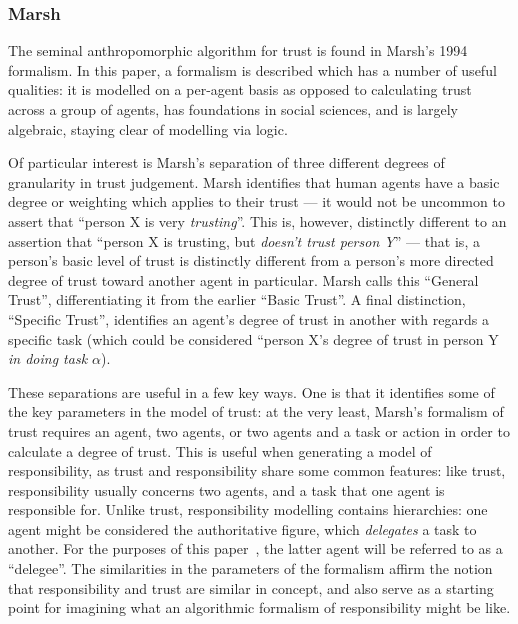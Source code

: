 \subsubsection{Marsh}
The seminal anthropomorphic algorithm for trust is found in Marsh's 1994 formalism\cite{Marsh1994FormalisingConcept}. In this paper, a formalism is described which has a number of useful qualities: it is modelled on a per-agent basis as opposed to calculating trust across a group of agents, has foundations in social sciences, and is largely algebraic, staying clear of modelling via logic.

Of particular interest is Marsh's separation of three different degrees of granularity in trust judgement. Marsh identifies that human agents have a basic degree or weighting which applies to their trust --- it would not be uncommon to assert that ``person X is very \emph{trusting}''. This is, however, distinctly different to an assertion that ``person X is trusting, but \emph{doesn't trust person Y}'' --- that is, a person's basic level of trust is distinctly different from a person's more directed degree of trust toward another agent in particular. Marsh calls this ``General Trust'', differentiating it from the earlier ``Basic Trust''. A final distinction, ``Specific Trust'', identifies an agent's degree of trust in another with regards a specific task (which could be considered ``person X's degree of trust in person Y \emph{in doing task \(\alpha\)}).\par

These separations are useful in a few key ways. One is that it identifies some of the key parameters in the model of trust: at the very least, Marsh's formalism of trust requires an agent, two agents, or two agents and a task or action in order to calculate a degree of trust. This is useful when generating a model of responsibility, as trust and responsibility share some common features: like trust, responsibility usually concerns two agents, and a task that one agent is responsible for. Unlike trust, responsibility modelling contains hierarchies: one agent might be considered the authoritative figure, which \emph{delegates} a task to another. For the purposes of this paper~, the latter agent will be referred to as a ``delegee''. The similarities in the parameters of the formalism affirm the notion that responsibility and trust are similar in concept, and also serve as a starting point for imagining what an algorithmic formalism of responsibility might be like.\par

